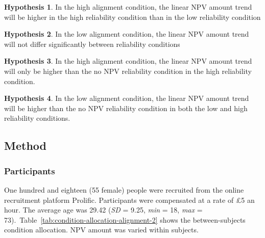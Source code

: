 \documentclass[a4paper, nobind, dvipsnames]{templates/ociamthesis}
\theoremstyle{definition}
\theoremstyle{definition}
\theoremstyle{definition}
\theoremstyle{definition}
\newtheorem{hypothesis}{Hypothesis}[chapter]
\theoremstyle{remark}
\begin{document}
\begin{hypothesis}
\protect\hypertarget{hyp:allocation-alignment-high-alignment-2}{}{\label{hyp:allocation-alignment-high-alignment-2} }In the high alignment condition, the linear NPV amount trend will be higher in
the high reliability condition than in the low reliability condition
\end{hypothesis}

\begin{hypothesis}
\protect\hypertarget{hyp:allocation-alignment-low-alignment-2}{}{\label{hyp:allocation-alignment-low-alignment-2} }In the low alignment condition, the linear NPV amount trend will not differ
significantly between reliability conditions
\end{hypothesis}

\begin{hypothesis}
\protect\hypertarget{hyp:allocation-alignment-high-no-NPV-alignment-2}{}{\label{hyp:allocation-alignment-high-no-NPV-alignment-2} }In the high alignment condition, the linear NPV amount trend will only be higher
than the no NPV reliability condition in the high reliability condition.
\end{hypothesis}

\begin{hypothesis}
\protect\hypertarget{hyp:allocation-alignment-low-no-NPV-alignment-2}{}{\label{hyp:allocation-alignment-low-no-NPV-alignment-2} }In the low alignment condition, the linear NPV amount trend will be higher than
the no NPV reliability condition in both the low and high reliability
conditions.
\end{hypothesis}

\hypertarget{method-2}{%
\subsection{Method}\label{method-2}}

\hypertarget{participants-2}{%
\subsubsection{Participants}\label{participants-2}}

One hundred and eighteen (55 female) people were recruited from the online recruitment platform Prolific. Participants were compensated at a rate of £5 an hour. The average age was 29.42 (\emph{SD} = 9.25, \emph{min} = 18, \emph{max} = 73).~Table~\ref{tab:condition-allocation-alignment-2}
shows the between-subjects condition allocation. NPV amount was varied within
subjects.
\end{document}
